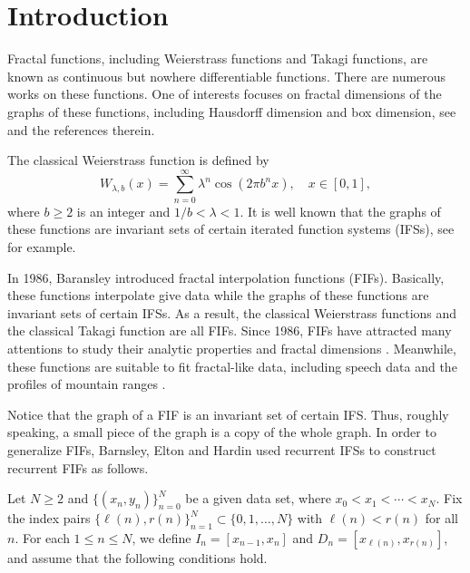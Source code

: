 \documentclass[11pt]{amsart}
\theoremstyle{definition}
\theoremstyle{remark}
\numberwithin{equation}{section}
\begin{document}
\maketitle


\section{Introduction}


Fractal functions, including Weierstrass functions and Takagi functions, are known as continuous but nowhere differentiable functions. There are numerous works on these functions. One of interests focuses on fractal dimensions of the graphs of these functions, including Hausdorff dimension and box dimension, see \cite{AllKaw11, BBR14, HuLau93, RenShen21, Shen18} and the references therein.

The classical Weierstrass function is defined by
\[
   W_{\lambda,b}(x)=\sum_{n=0}^\infty \lambda^n \cos(2\pi b^n x), \quad x\in [0,1],
\]  
where $b\geq 2$ is an integer and $1/b<\lambda<1$. It is well known that the graphs of these functions are invariant sets of certain iterated function systems (IFSs), see \cite[section~6]{JR24} for example. 

In 1986, Baransley \cite{B86} introduced fractal interpolation functions (FIFs). Basically, these functions interpolate give data while the graphs of these functions are invariant sets of certain IFSs. As a result, the classical Weierstrass functions and the classical Takagi function are all FIFs. Since 1986, FIFs have attracted many attentions to study their analytic properties \cite{All20,BH89,CKV15,Dubuc18,WY13} and fractal dimensions \cite{APN17,BRS20,BaMa15,HarMas86,JhaVer21,RSY09}. Meanwhile, these functions are suitable to fit fractal-like data, including speech data and the profiles of mountain ranges \cite{MH92,VDL94}.

Notice that the graph of a FIF is an invariant set of certain IFS. Thus, roughly speaking, a small piece of the graph is a copy of the whole graph. In order to generalize FIFs, Barnsley, Elton and Hardin \cite{BEH89} used recurrent IFSs to construct recurrent FIFs as follows. 


Let $N\geq 2$ and $\{(x_n, y_n)\}_{n=0}^N $ be a given data set, where $x_0 < x_1 < \cdots < x_N$. Fix the index pairs $ \{\ell(n), r(n)\}_{n=1}^N \subset \{0,1,\ldots,N\} $ with $ \ell(n) < r(n) $ for all $n$. For each $1 \leq n \leq N $, we define $I_n = [x_{n-1}, x_n] $ and $ D_n = [x_{\ell(n)}, x_{r(n)}] $, and assume that the following conditions hold.
\end{document}
